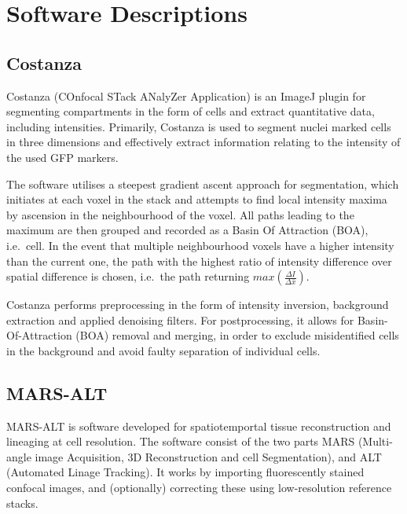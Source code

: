 
\chapter{Software Descriptions}

\section{Costanza}
Costanza (COnfocal STack ANalyZer Application) \CITE is an ImageJ plugin for
segmenting compartments in the form of cells and extract quantitative data,
including intensities. Primarily, Costanza is used to segment nuclei marked
cells in three dimensions and effectively extract information relating to the
intensity of the used GFP markers.

The software utilises a steepest gradient ascent approach for segmentation, which
initiates at each voxel in the stack and attempts to find local intensity maxima
by ascension in the neighbourhood of the voxel. All paths leading to the maximum
are then grouped and recorded as a Basin Of Attraction (BOA), i.e.\ cell. In the event that
multiple neighbourhood voxels have a higher intensity than the current one, the
path with the highest ratio of intensity difference over spatial difference is
chosen, i.e.\ the path returning $max\left( \frac{\Delta I}{\Delta \bar x} \right)$.

Costanza performs preprocessing in the form
of intensity inversion, background extraction and applied denoising filters. 
For postprocessing, it allows for Basin-Of-Attraction (BOA) removal and merging, in
order to exclude misidentified cells in the background and avoid faulty
separation of individual cells. 


\section{MARS-ALT}
MARS-ALT is software developed for spatiotemportal tissue reconstruction and lineaging at cell
resolution. The software consist of the two parts MARS (Multi-angle image
Acquisition, 3D Reconstruction and cell Segmentation), and ALT (Automated Linage
Tracking). It works by importing fluorescently stained confocal images, and
(optionally) correcting these using low-resolution reference stacks. 

